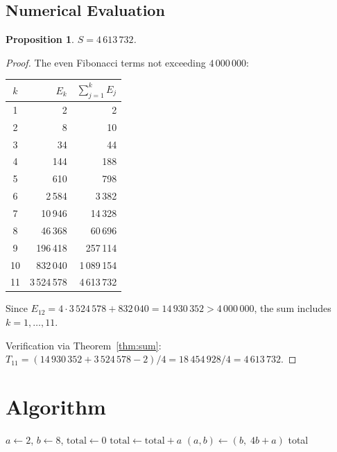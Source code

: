 \documentclass[11pt]{article}
\newtheorem{proposition}[theorem]{Proposition}
\begin{document}
\subsection{Numerical Evaluation}

\begin{proposition}
$S = 4\,613\,732$.
\end{proposition}

\begin{proof}
The even Fibonacci terms not exceeding $4\,000\,000$:
\begin{center}
\begin{tabular}{crr}
\toprule
$k$ & $E_k$ & $\sum_{j=1}^{k} E_j$ \\
\midrule
1  & 2 & 2 \\
2  & 8 & 10 \\
3  & 34 & 44 \\
4  & 144 & 188 \\
5  & 610 & 798 \\
6  & 2\,584 & 3\,382 \\
7  & 10\,946 & 14\,328 \\
8  & 46\,368 & 60\,696 \\
9  & 196\,418 & 257\,114 \\
10 & 832\,040 & 1\,089\,154 \\
11 & 3\,524\,578 & 4\,613\,732 \\
\bottomrule
\end{tabular}
\end{center}
Since $E_{12} = 4 \cdot 3\,524\,578 + 832\,040 = 14\,930\,352 > 4\,000\,000$, the sum includes $k = 1, \ldots, 11$.

Verification via Theorem~\ref{thm:sum}: $T_{11} = (14\,930\,352 + 3\,524\,578 - 2)/4 = 18\,454\,928/4 = 4\,613\,732$.
\end{proof}

\section{Algorithm}

\begin{algorithm}[H]
\caption{\textsc{SumEvenFibonacci}$(L)$}
\begin{algorithmic}[1]
\STATE $a \gets 2$, $b \gets 8$, $\mathrm{total} \gets 0$
    \STATE $\mathrm{total} \gets \mathrm{total} + a$
    \STATE $(a, b) \gets (b,\; 4b + a)$
\ENDWHILE
\RETURN total
\end{algorithmic}
\end{algorithm}
\end{document}
